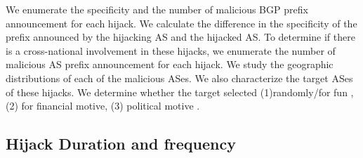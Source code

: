 We enumerate the specificity and the number of malicious BGP prefix announcement for each hijack. We calculate the difference in the specificity of the prefix announced by the hijacking AS and the hijacked AS. To determine if there is a cross-national involvement in these hijacks, we enumerate the number of malicious AS prefix announcement for each hijack. We study the geographic distributions of each of the malicious ASes.
We also characterize the target ASes of these hijacks. We determine whether the target selected (1)randomly/for fun , (2) for financial motive, (3) political motive .
\subsection{Hijack Duration and frequency}


